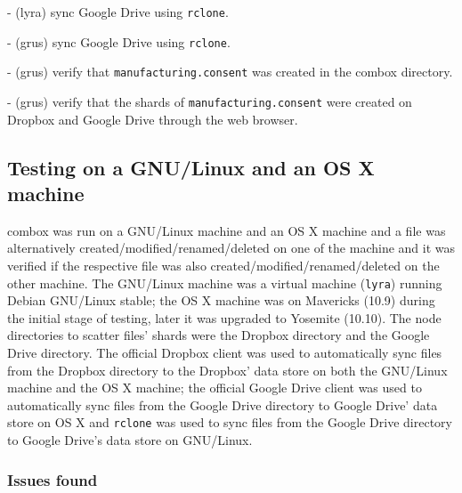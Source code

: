 - (lyra) sync Google Drive using \verb+rclone+.

- (grus) sync Google Drive using \verb+rclone+.

- (grus) verify that \verb+manufacturing.consent+ was created in the
combox directory.

- (grus) verify that the shards of \verb+manufacturing.consent+ were
created on Dropbox and Google Drive through the web browser.

\subsection{Testing on a GNU/Linux and an OS X machine}

combox was run on a GNU/Linux machine and an OS X machine and a file
was alternatively created/modified/renamed/deleted on one of the
machine and it was verified if the respective file was also
created/modified/renamed/deleted on the other machine. The GNU/Linux
machine was a virtual machine (\verb+lyra+) running Debian GNU/Linux
stable; the OS X machine was on Mavericks (10.9) during the initial
stage of testing, later it was upgraded to Yosemite (10.10). The node
directories to scatter files' shards were the Dropbox directory and
the Google Drive directory. The official Dropbox client was used to
automatically sync files from the Dropbox directory to the Dropbox'
data store on both the GNU/Linux machine and the OS X machine; the
official Google Drive client was used to automatically sync files from
the Google Drive directory to Google Drive' data store on OS X and
\verb+rclone+\cite{program:rclone} was used to sync files from the
Google Drive directory to Google Drive's data store on GNU/Linux.

\subsubsection{Issues found}

